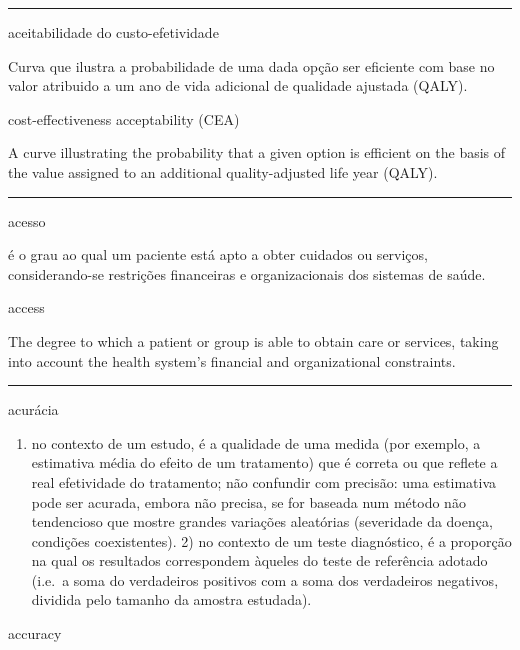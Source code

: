 \documentclass[
  openany]{book}
\providecommand{\tightlist}{%
  \setlength{\itemsep}{0pt}\setlength{\parskip}{0pt}}
\begin{document}
\begin{center}\rule{0.5\linewidth}{0.5pt}\end{center}

aceitabilidade do custo-efetividade

Curva que ilustra a probabilidade de uma dada opção ser eficiente com base no valor atribuido a um ano de vida adicional de qualidade ajustada (QALY).

cost-effectiveness acceptability (CEA)

A curve illustrating the probability that a given option is efficient on the basis of the value assigned to an additional quality-adjusted life year (QALY).

\begin{center}\rule{0.5\linewidth}{0.5pt}\end{center}

acesso

é o grau ao qual um paciente está apto a obter cuidados ou serviços, considerando-se restrições financeiras e organizacionais dos sistemas de saúde.

access

The degree to which a patient or group is able to obtain care or services, taking into account the health system's financial and organizational constraints.

\begin{center}\rule{0.5\linewidth}{0.5pt}\end{center}

acurácia

\begin{enumerate}
\def\labelenumi{\arabic{enumi})}
\tightlist
\item
  no contexto de um estudo, é a qualidade de uma medida (por exemplo, a estimativa média do efeito de um tratamento) que é correta ou que reflete a real efetividade do tratamento; não confundir com precisão: uma estimativa pode ser acurada, embora não precisa, se for baseada num método não tendencioso que mostre grandes variações aleatórias (severidade da doença, condições coexistentes). 2) no contexto de um teste diagnóstico, é a proporção na qual os resultados correspondem àqueles do teste de referência adotado (i.e.~a soma do verdadeiros positivos com a soma dos verdadeiros negativos, dividida pelo tamanho da amostra estudada).
\end{enumerate}

accuracy
\end{document}
